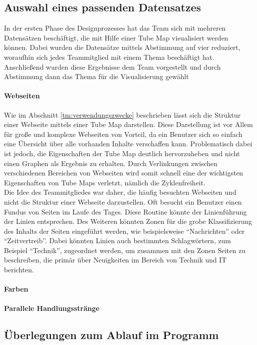 \subsection{Auswahl eines passenden Datensatzes}
In der ersten Phase des Designprozesses hat das Team sich mit mehreren Datensätzen beschäftigt, die mit Hilfe einer Tube Map visualisiert werden können. Dabei wurden die Datensätze mittels Abstimmung auf vier reduziert, woraufhin sich jedes Teammitglied mit einem Thema beschäftigt hat. Anschließend wurden diese Ergebnisse dem Team vorgestellt und durch Abstimmung dann das Thema für die Visualisierung gewählt
\paragraph{Webseiten}
Wie im Abschnitt \ref{tm:verwendungszwecke} beschrieben lässt sich die Struktur einer Webseite mittels einer Tube Map darstellen.  Diese Darstellung ist vor Allem für große und komplexe Webseiten von Vorteil, da ein Benutzer sich so einfach eine Übersicht über alle vorhanden Inhalte verschaffen kann. Problematisch dabei ist jedoch, die Eigenschaften der Tube Map deutlich hervorzuheben und nicht einen Graphen als Ergebnis zu erhalten. Durch Verlinkungen zwischen verschiedenen Bereichen von Webseiten wird somit schnell eine der wichtigsten Eigenschaften von Tube Maps verletzt, nämlich die Zyklenfreiheit. \\
Die Idee des Teammitgliedes war daher, die häufig besuchten Webseiten und nicht die Struktur einer Webseite darzustellen. Oft besucht ein Benutzer einen Fundus von Seiten im Laufe des Tages. Diese Routine könnte der Linienführung der Linien entsprechen. Des Weiteren könnten Zonen für die grobe Klassifizierung des Inhalts der Seiten eingeführt werden, wie beispielsweise "`Nachrichten"' oder "`Zeitvertreib"'. Dabei könnten Linien auch bestimmten Schlagwörtern, zum Beispiel "`Technik"', zugeordnet werden, um zusammen mit den Zonen Seiten zu beschreiben, die primär über Neuigkeiten im Bereich von Technik und IT berichten. 

\paragraph{Farben}
\paragraph{Parallele Handlungsstränge}

\subsection{Überlegungen zum Ablauf im Programm}
